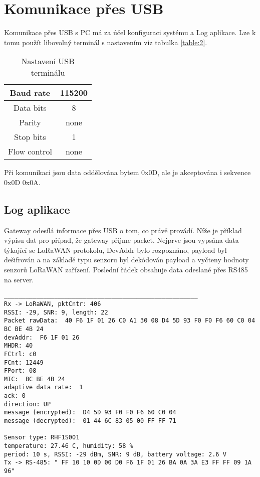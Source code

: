 \section{Komunikace přes USB}
Komunikace přes USB s PC má za účel konfiguraci systému a Log aplikace. Lze k tomu použít libovolný terminál s nastavením viz tabulka \ref{table:2}.

\begin{table}[!h]
    \centering
    \begin{tabular}{ |c|c| }
     \hline

     Baud rate              & 115200           \\ \hline
     Data bits              & 8                 \\ \hline
     Parity                 & none              \\ \hline
     Stop bits              & 1                 \\ \hline
     Flow control           & none               \\ \hline

    \end{tabular}
    \caption{Nastavení USB terminálu}
    \label{table:3}
\end{table}

Při komunikaci jsou data oddělována bytem 0x0D, ale je akceptována i sekvence 0x0D 0x0A. 

\subsection{Log aplikace}
Gateway odesílá informace přes USB o tom, co právě provádí. Níže je příklad výpisu dat pro případ, že gateway přijme packet. Nejprve jsou vypsána data týkající se LoRaWAN protokolu, DevAddr bylo rozpoznáno, payload byl dešifrován a na základě typu senzoru byl dekódován payload a vyčteny hodnoty senzorů LoRaWAN zařízení. Poslední řádek obsahuje data odeslané přes RS485 na server.


\begin{lstlisting}
______________________________________________________
Rx -> LoRaWAN, pktCntr: 406
RSSI: -29, SNR: 9, length: 22
Packet rawData:  40 F6 1F 01 26 C0 A1 30 08 D4 5D 93 F0 F0 F6 60 C0 04 BC BE 4B 24
devAddr:  F6 1F 01 26
MHDR: 40
FCtrl: c0
FCnt: 12449
FPort: 08
MIC:  BC BE 4B 24
adaptive data rate:  1
ack: 0
direction: UP
message (encrypted):  D4 5D 93 F0 F0 F6 60 C0 04
message (decrypted):  01 44 6C 83 05 00 FF FF 71

Sensor type: RHF1S001
temperature: 27.46 C, humidity: 58 %
period: 10 s, RSSI: -29 dBm, SNR: 9 dB, battery voltage: 2.6 V
Tx -> RS-485: " FF 10 10 0D 00 D0 F6 1F 01 26 BA 0A 3A E3 FF FF 09 1A 96"
\end{lstlisting}

